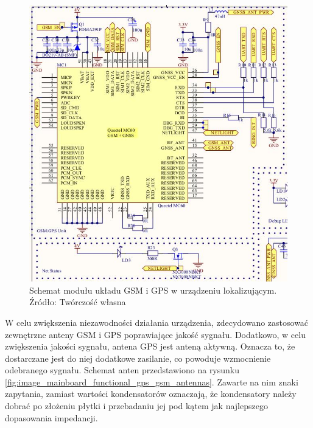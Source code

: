 \begin{figure}[H]
	\centering
	\includegraphics[width=15cm]{img/schematics/mainboard_functional_gps.jpg}
	\caption{Schemat modułu układu GSM i GPS w urządzeniu lokalizującym. \\ Źródło: Twórczość własna}
	\label{fig:image_mainboard_functional_gps_gsm}
\end{figure}

W celu zwiększenia niezawodności działania urządzenia, zdecydowano zastosować zewnętrzne anteny GSM i GPS poprawiające jakość sygnału. Dodatkowo, w celu zwiększenia jakości sygnału, antena GPS jest anteną aktywną. Oznacza to, że dostarczane jest do niej dodatkowe zasilanie, co powoduje wzmocnienie odebranego sygnału. Schemat anten przedstawiono na rysunku \ref{fig:image_mainboard_functional_gps_gsm_antennas}. Zawarte na nim znaki zapytania, zamiast wartości kondensatorów oznaczają, że kondensatory należy dobrać po złożeniu płytki i przebadaniu jej pod kątem jak najlepszego dopasowania impedancji.

